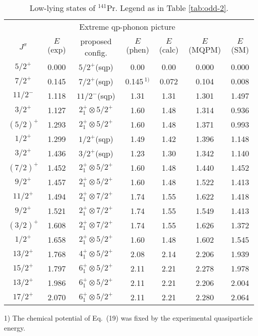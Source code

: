 \begin{table}[htbp]
\begin{center}
\caption{Low-lying states of $^{141}$Pr. Legend as in Table \ref{tab:odd-2}.}
\begin{tabular}{cc|cccc|c}
\hline
& & \multicolumn{3}{c}{Extreme qp-phonon picture} & & \\
$J^{\pi}$ & $E$(exp) & proposed config. & $E$(phen) & $E$(calc) 
& $E$(MQPM) & $E$(SM) \\ 
\hline
$5/2^{+}$ & 0.000 & $5/2^+$(sqp) & 0.00 & 0.00 & 0.000 & 0.000 \\
$7/2^{+}$ & 0.145 & $7/2^+$(sqp) & 0.145$^{\ 1)}$ & 0.072 & 0.104 & 0.008 \\
$11/2^{-}$ & 1.118 & $11/2^-$(sqp) & 1.31 & 1.31 & 1.301 & 1.497 \\
$3/2^{+}$ & 1.127 & $2^+_1\otimes 5/2^{+}$ & 1.60 & 1.48 & 1.314 & 0.936 \\
$(5/2)^{+}$ & 1.293 & $2^+_1\otimes 5/2^+$ & 1.60 & 1.48 & 1.371 & 0.993 \\
$1/2^{+}$ & 1.299 & $1/2^+$(sqp) & 1.49 & 1.42 & 1.396 & 1.148 \\
$3/2^{+}$ & 1.436 & $3/2^+$(sqp) & 1.23 & 1.30 & 1.342 & 1.140 \\
$(7/2)^{+}$ & 1.452 & $2^+_1\otimes 5/2^+$ & 1.60 & 1.48 & 1.440 & 1.452 \\
$9/2^{+}$ & 1.457 & $2^+_1\otimes 5/2^+$ & 1.60 & 1.48 & 1.522 & 1.413 \\
$11/2^{+}$ & 1.494 & $2^+_1\otimes 7/2^+$ & 1.74 & 1.55 & 1.622 & 1.418 \\
$9/2^{+}$ & 1.521 & $2^+_1\otimes 7/2^+$ & 1.74 & 1.55 & 1.549 & 1.413 \\
$(3/2)^{+}$ & 1.608 & $2^+_1\otimes 7/2^+$ & 1.74 & 1.55 & 1.626 & 1.372 \\
$1/2^{+}$ & 1.658 & $2^+_1\otimes 5/2^+$ & 1.60 & 1.48 & 1.602 &1.545  \\
$13/2^{+}$ & 1.768 & $4^+_1\otimes 5/2^+$ & 2.08 & 2.14 & 2.206 & 1.939 \\
$15/2^{+}$ & 1.797 & $6^+_1\otimes 5/2^+$ & 2.11 & 2.21 & 2.278 & 1.978 \\
$13/2^{+}$ & 1.986 & $6^+_1\otimes 5/2^+$ & 2.11 & 2.21 & 2.206 & 2.004 \\
$17/2^{+}$ & 2.070 & $6^+_1\otimes 5/2^+$ & 2.11 & 2.21 & 2.280 & 2.064 \\
\hline
\end{tabular}
1) The chemical potential of Eq.\ (19) was fixed by the experimental 
quasiparticle energy. 
\label{tab:odd-5}
\end{center}
\end{table}
